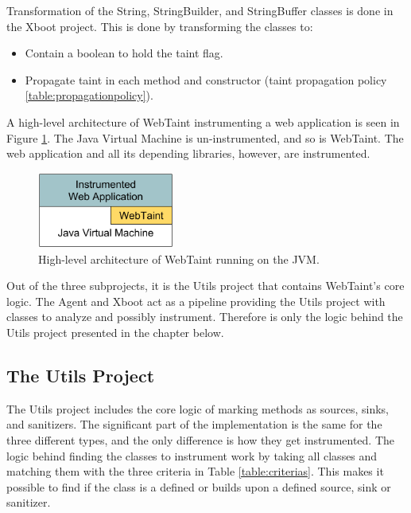 Transformation of the String, StringBuilder, and StringBuffer classes is done in the Xboot project. This is done by transforming the classes to: 

\hfill
\begin{itemize}
    \item Contain a boolean to hold the taint flag.
    \item Propagate taint in each method and constructor (taint propagation policy \ref{table:propagationpolicy}).
\end{itemize}
\hfill

A high-level architecture of WebTaint instrumenting a web application is seen in Figure \ref{fig:WebTaint}. The Java Virtual Machine is un-instrumented, and so is WebTaint. The web application and all its depending libraries, however, are instrumented.

\begin{figure}[H]
    \centering
    \includegraphics[width=0.4\textwidth]{images/WebTaintArchitecture.png}
    \caption{High-level architecture of WebTaint running on the JVM.}
    \label{fig:WebTaint}
\end{figure}

Out of the three subprojects, it is the Utils project that contains WebTaint's core logic. The Agent and Xboot act as a pipeline providing the Utils project with classes to analyze and possibly instrument. Therefore is only the logic behind the Utils project presented in the chapter below.

\subsection{The Utils Project}
The Utils project includes the core logic of marking methods as sources, sinks, and sanitizers. The significant part of the implementation is the same for the three different types, and the only difference is how they get instrumented. The logic behind finding the classes to instrument work by taking all classes and matching them with the three criteria in Table \ref{table:criterias}. This makes it possible to find if the class is a defined or builds upon a defined source, sink or sanitizer.

